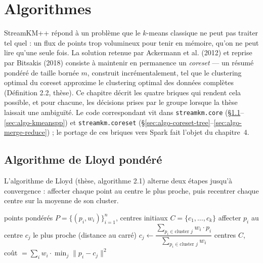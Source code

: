 %
%

\chapter{Algorithmes}
\label{ch:algorithmes}

StreamKM++ répond à un problème que le $k$-means classique ne peut pas
traiter tel quel : un flux de points trop volumineux pour tenir en mémoire,
qu'on ne peut lire qu'une seule fois. La solution retenue par Ackermann
et al. (2012) et reprise par Bitsakis (2018) consiste à maintenir en
permanence un \emph{coreset} --- un résumé pondéré de taille bornée $m$,
construit incrémentalement, tel que le clustering optimal du coreset
approxime le clustering optimal des données complètes (Définition 2.2,
thèse). Ce chapitre décrit les quatre briques qui rendent cela possible,
et pour chacune, les décisions prises par le groupe lorsque la thèse
laissait une ambiguïté. Le code correspondant vit dans \texttt{streamkm.core}
(§\ref{sec:algo-lloyd}--\ref{sec:algo-kmeanspp}) et \texttt{streamkm.coreset}
(§\ref{sec:algo-coreset-tree}--\ref{sec:algo-merge-reduce}) ; le portage de ces
briques vers Spark fait l'objet du chapitre~4.

\section{Algorithme de Lloyd pondéré}
\label{sec:algo-lloyd}

L'algorithme de Lloyd (thèse, algorithme 2.1) alterne deux étapes jusqu'à
convergence : affecter chaque point au centre le plus proche, puis recentrer
chaque centre sur la moyenne de son cluster.

\begin{algorithm}[H]
\caption{Lloyd pondéré (thèse, algo. 2.1 --- \texttt{KMeans.lloyd})}
\begin{algorithmic}[1]
\Require points pondérés $P = \{(p_i, w_i)\}_{i=1}^n$, centres initiaux $C = \{c_1,\dots,c_k\}$
\Repeat
    \State affecter $p_i$ au centre $c_j$ le plus proche (distance au carré)
  \EndFor
    \State $c_j \gets \dfrac{\sum_{p_i \in \text{cluster } j} w_i \cdot p_i}{\sum_{p_i \in \text{cluster } j} w_i}$
  \EndFor
{}
\Ensure centres $C$, coût $= \sum_i w_i \cdot \min_j \lVert p_i - c_j\rVert^2$
\end{algorithmic}
\end{algorithm}


